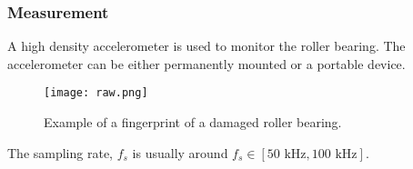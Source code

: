 \begin{frame}
    \frametitle{Measurement}
    \small
    A high density accelerometer is used to monitor the roller bearing.  The accelerometer can be either permanently mounted or a portable device.
    \begin{figure}
        \centering
        \texttt{[image: raw.png]}
        \caption{Example of a fingerprint of a damaged roller bearing.}
        \label{fig:raw}
    \end{figure}
    The sampling rate, $f_s$ is usually around $f_s \in [50\text{ kHz}, 100\text{ kHz}]$.
   
\end{frame}